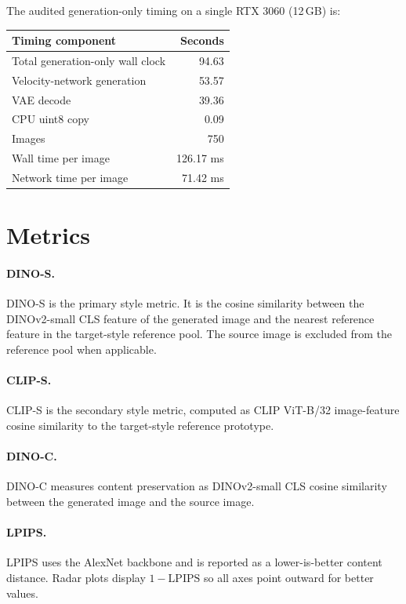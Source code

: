 \documentclass[10pt,twocolumn]{article}
\newcommand{\dinos}{DINO-S}
\newcommand{\dinoc}{DINO-C}
\newcommand{\clips}{CLIP-S}
\begin{document}
The audited generation-only timing on a single RTX 3060 (12\,GB) is:

\begin{center}
\begin{tabular}{lr}
\toprule
Timing component & Seconds \\
\midrule
Total generation-only wall clock & 94.63 \\
Velocity-network generation & 53.57 \\
VAE decode & 39.36 \\
CPU uint8 copy & 0.09 \\
Images & 750 \\
Wall time per image & 126.17 ms \\
Network time per image & 71.42 ms \\
\bottomrule
\end{tabular}
\end{center}

\section{Metrics}

\paragraph{\dinos.}
\dinos{} is the primary style metric. It is the cosine similarity between the DINOv2-small
CLS feature of the generated image and the nearest reference feature in the target-style
reference pool. The source image is excluded from the reference pool when applicable.

\paragraph{\clips.}
\clips{} is the secondary style metric, computed as CLIP ViT-B/32 image-feature cosine
similarity to the target-style reference prototype.

\paragraph{\dinoc.}
\dinoc{} measures content preservation as DINOv2-small CLS cosine similarity between the
generated image and the source image.

\paragraph{LPIPS.}
LPIPS uses the AlexNet backbone and is reported as a lower-is-better content distance.
Radar plots display \(1-\mathrm{LPIPS}\) so all axes point outward for better values.
\end{document}
